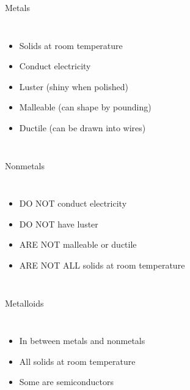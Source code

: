 \documentclass[notes=onlyslideswithnotes,notes=hide]{beamer}
\begin{document}
\begin{frame}{Metals}
	\begin{columns}
		\begin{itemize}
			\item Solids at room temperature
			\item Conduct electricity
			\item Luster (shiny when polished)
			\item Malleable (can shape by pounding)
			\item Ductile (can be drawn into wires)
		\end{itemize}
		\centering
		
	\end{columns}
\end{frame}

\begin{frame}{Nonmetals}
	\begin{columns}
		\column{0.45\textwidth}
		\begin{itemize}
			\item \alert{DO NOT} conduct electricity
			\item \alert{DO NOT} have luster
			\item \alert{ARE NOT} malleable or ductile
			\item \alert{ARE NOT ALL} solids at room temperature
		\end{itemize}
		\column{0.55\textwidth}
		\centering
		
	\end{columns}
\end{frame}

\begin{frame}{Metalloids}
	\begin{columns}
		\begin{itemize}
			\item In between metals and nonmetals
			\item All solids at room temperature
			\item Some are semiconductors
		\end{itemize}
		 \centering
		
	\end{columns}
\end{frame}
\end{document}
